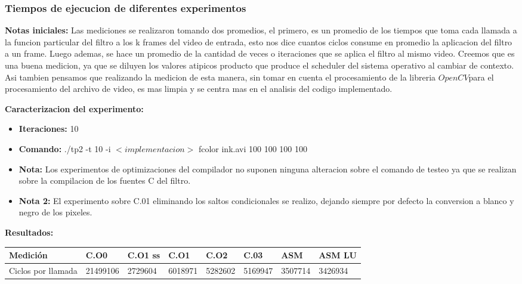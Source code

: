 \subsubsection{Tiempos de ejecucion de diferentes experimentos}
\par
\textbf{Notas iniciales: }
Las mediciones se realizaron tomando dos promedios, el primero, es un promedio de los tiempos que toma cada llamada a la funcion particular del filtro a los k frames del video de entrada, esto nos dice cuantos ciclos consume en promedio la aplicacion del filtro a un frame. Luego ademas, se hace un promedio de la cantidad de veces o iteraciones que se aplica el filtro al mismo video. Creemos que es una buena medicion, ya que se diluyen los valores atipicos producto que produce el scheduler del sistema operativo al cambiar de contexto. Asi tambien pensamos que realizando la medicion de esta manera, sin tomar en cuenta el procesamiento de la libreria $OpenCV$para el procesamiento del archivo de video, es mas limpia y se centra mas en el analisis del codigo implementado.
\par
\bigskip
\textbf{Caracterizacion del experimento: }
\begin{itemize}
    \item \textbf{Iteraciones: } 10
    \item \textbf{Comando: } ./tp2 -t 10 -i $<implementacion>$ fcolor ink.avi 100 100 100 100
    \item \textbf{Nota:} Los experimentos de optimizaciones del compilador no suponen ninguna alteracion sobre el comando de testeo ya que se realizan sobre la compilacion de los fuentes C del filtro.
    \item \textbf{Nota 2:} El experimento sobre C.01 eliminando los saltos condicionales se realizo, dejando siempre por defecto la conversion a blanco y negro de los pixeles.
\end{itemize}
\par
\textbf{Resultados:}\\
\begin{center}
    \begin{tabular}{|l|l|l|l|l|l|l|l|}
        \hline
        Medición  & C.O0  & C.O1 ss & C.O1  & C.O2  & C.03  & ASM  & ASM LU \\
        \hline
        Ciclos por llamada & 21499106  & 2729604 & 6018971 & 5282602 & 5169947 & 3507714 & 3426934\\
        \hline
    \end{tabular}
\end{center}
